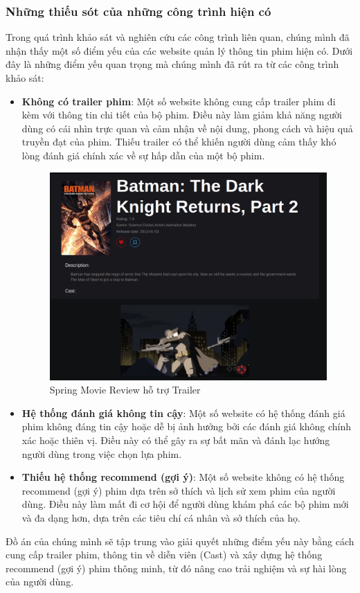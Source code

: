 \documentclass[12pt]{article}
\begin{document}
\subsubsection{Những thiếu sót của những công trình hiện có}
Trong quá trình khảo sát và nghiên cứu các công trình liên quan, chúng mình đã nhận thấy một số điểm yếu của các website quản lý thông tin phim hiện có. Dưới đây là những điểm yếu quan trọng mà chúng mình đã rút ra từ các công trình khảo sát:
\begin{itemize}
    \item \textbf{Không có trailer phim}: Một số website không cung cấp trailer phim đi kèm với thông tin chi tiết của bộ phim. Điều này làm giảm khả năng người dùng có cái nhìn trực quan và cảm nhận về nội dung, phong cách và hiệu quả truyền đạt của phim. Thiếu trailer có thể khiến người dùng cảm thấy khó lòng đánh giá chính xác về sự hấp dẫn của một bộ phim.
    \begin{figure}[H]
        \centering
        \includegraphics[scale=0.4]{Figs/Trailer_Review.png}
        \caption{Spring Movie Review hỗ trợ Trailer}
    \end{figure}
    \item \textbf{Hệ thống đánh giá không tin cậy}: Một số website có hệ thống đánh giá phim không đáng tin cậy hoặc dễ bị ảnh hưởng bởi các đánh giá không chính xác hoặc thiên vị. Điều này có thể gây ra sự bất mãn và đánh lạc hướng người dùng trong việc chọn lựa phim.
    \item \textbf{Thiếu hệ thống recommend (gợi ý)}: Một số website không có hệ thống recommend (gợi ý) phim dựa trên sở thích và lịch sử xem phim của người dùng. Điều này làm mất đi cơ hội để người dùng khám phá các bộ phim mới và đa dạng hơn, dựa trên các tiêu chí cá nhân và sở thích của họ.
\end{itemize}
Đồ án của chúng mình sẽ tập trung vào giải quyết những điểm yếu này bằng cách cung cấp trailer phim, thông tin về diễn viên (Cast) và xây dựng hệ thống recommend (gợi ý) phim thông minh, từ đó nâng cao trải nghiệm và sự hài lòng của người dùng.
\end{document}
